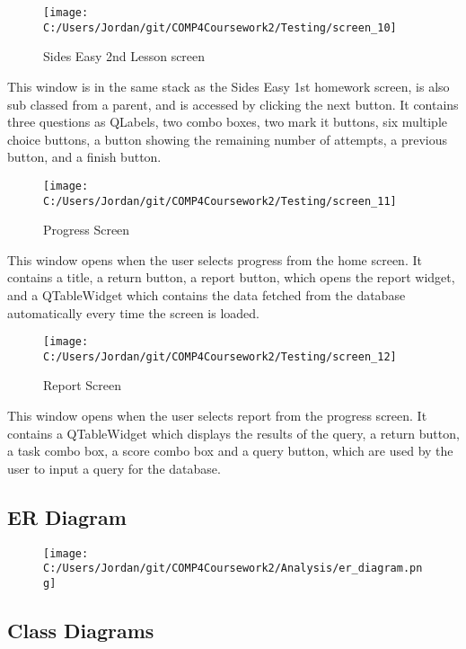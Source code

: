 \begin{figure}[H]
    \label{fig: Second Screen}\caption{Sides Easy 2nd Lesson screen}
    \texttt{[image: C:/Users/Jordan/git/COMP4Coursework2/Testing/screen\_10]}
\end{figure}

This window is in the same stack as the Sides Easy 1st homework screen, is also sub classed from a parent, and is accessed by clicking the next button. It contains three questions as QLabels, two combo boxes, two mark it buttons, six multiple choice buttons, a button showing the remaining number of attempts, a previous button, and a finish button.

\begin{figure}[H]
    \label{fig: Second Screen}\caption{Progress Screen}
    \texttt{[image: C:/Users/Jordan/git/COMP4Coursework2/Testing/screen\_11]}
\end{figure}

This window opens when the user selects progress from the home screen. It contains a title, a return button, a report button, which opens the report widget, and a QTableWidget which contains the data fetched from the database automatically every time the screen is loaded.

\begin{figure}[H]
    \label{fig: Second Screen}\caption{Report Screen}
    \texttt{[image: C:/Users/Jordan/git/COMP4Coursework2/Testing/screen\_12]}
\end{figure}

This window opens when the user selects report from the progress screen. It contains a QTableWidget which displays the results of the query, a return button, a task combo box, a score combo box and a query button, which are used by the user to input a query for the database.

\subsection{ER Diagram}

\begin{figure}[H]
    \texttt{[image: C:/Users/Jordan/git/COMP4Coursework2/Analysis/er\_diagram.png]}
    \label{fig:print_function_result}
\end{figure}

\subsection{Class Diagrams}

